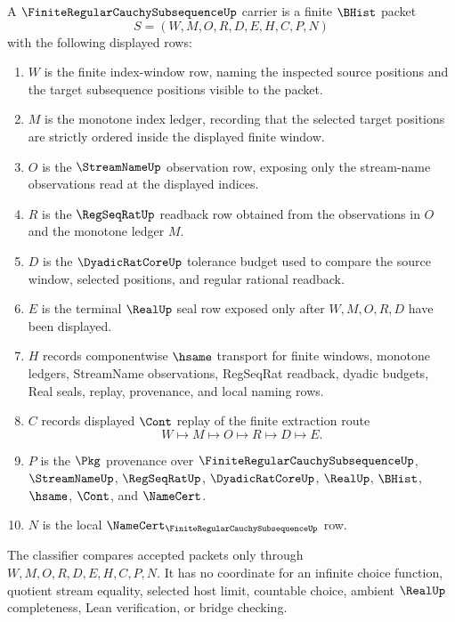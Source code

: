 \begin{definition}
\label{def:finite-regular-cauchy-subsequence-carrier}
A $\FiniteRegularCauchySubsequenceUp$ carrier is a finite $\BHist$ packet
$$
S=(W,M,O,R,D,E,H,C,P,N)
$$
with the following displayed rows:
\begin{enumerate}
\item $W$ is the finite index-window row, naming the inspected source positions and the target subsequence positions visible to the packet.
\item $M$ is the monotone index ledger, recording that the selected target positions are strictly ordered inside the displayed finite window.
\item $O$ is the $\StreamNameUp$ observation row, exposing only the stream-name observations read at the displayed indices.
\item $R$ is the $\RegSeqRatUp$ readback row obtained from the observations in $O$ and the monotone ledger $M$.
\item $D$ is the $\DyadicRatCoreUp$ tolerance budget used to compare the source window, selected positions, and regular rational readback.
\item $E$ is the terminal $\RealUp$ seal row exposed only after $W,M,O,R,D$ have been displayed.
\item $H$ records componentwise $\hsame$ transport for finite windows, monotone ledgers, StreamName observations, RegSeqRat readback, dyadic budgets, Real seals, replay, provenance, and local naming rows.
\item $C$ records displayed $\Cont$ replay of the finite extraction route
$$
W \longmapsto M \longmapsto O \longmapsto R \longmapsto D \longmapsto E .
$$
\item $P$ is the $\Pkg$ provenance over $\FiniteRegularCauchySubsequenceUp$, $\StreamNameUp$, $\RegSeqRatUp$, $\DyadicRatCoreUp$, $\RealUp$, $\BHist$, $\hsame$, $\Cont$, and $\NameCert$.
\item $N$ is the local $\NameCert_{\FiniteRegularCauchySubsequenceUp}$ row.
\end{enumerate}
The classifier compares accepted packets only through $W,M,O,R,D,E,H,C,P,N$. It has no coordinate for an infinite choice function, quotient stream equality, selected host limit, countable choice, ambient $\RealUp$ completeness, Lean verification, or bridge checking.
\end{definition}

